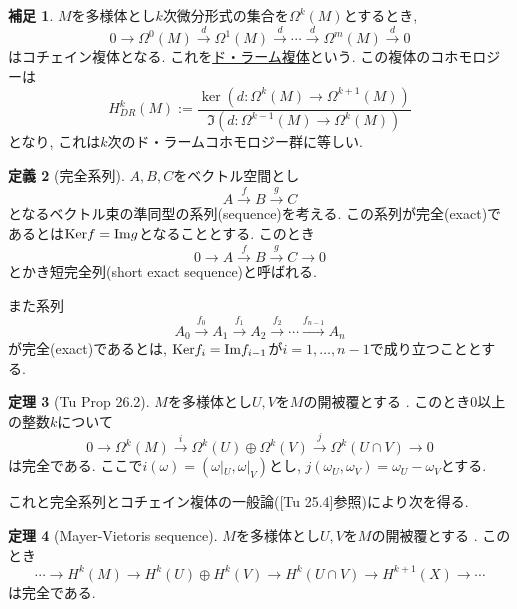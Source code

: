 \documentclass[dvipdfmx,a4paper,11pt]{article}
\newcommand{\Ker}{{\rm Ker}}
\newcommand{\ima}{{\rm Im}}
\theoremstyle{definition}
\newtheorem{thm}{定理}
\newtheorem{dfn}[thm]{定義}
\newtheorem{rem}[thm]{補足}
\begin{document}
   \begin{rem}
$M$を多様体とし$k$次微分形式の集合を$\Omega^{k}(M)$とするとき, 
$$
0 \rightarrow \Omega^{0}(M) \overset{d}{\rightarrow}\Omega^{1}(M) \overset{d}{\rightarrow} \cdots 
\overset{d}{\rightarrow} \Omega^{m}(M) \overset{d}{\rightarrow} 0
$$
はコチェイン複体となる. これを\underline{ド・ラーム複体}という. 
この複体のコホモロジーは
$$
H_{DR}^{k}(M):= \frac{\ker (d : \Omega^{k}(M) \rightarrow  \Omega^{k+1}(M))}{\Im(d : \Omega^{k-1}(M) \rightarrow  \Omega^{k}(M)) }
$$
となり, これは$k$次のド・ラームコホモロジー群に等しい.
\end{rem}


\begin{tcolorbox}[
    colback = white,
    colframe = green!35!black,
    fonttitle = \bfseries,
    breakable = true]
\begin{dfn}[完全系列]
$A,B,C$をベクトル空間とし
$$
A \stackrel{f}{\to} B \stackrel{g}{\to} C
$$
となるベクトル束の準同型の系列(sequence)を考える. 
この系列が完全(exact)であるとは$\Ker f = \ima g$となることとする. 
このとき
$$
0 \to A \stackrel{f}{\to} B \stackrel{g}{\to} C \to 0
$$
とかき短完全列(short exact sequence)と呼ばれる. 

また系列
$$
A_0 \stackrel{f_0}{\to} A_1 \stackrel{f_1}{\to} A_2 \stackrel{f_2}{\to}  \cdots \stackrel{f_{n-1}}{\to} A_{n}
$$
が完全(exact)であるとは, $\Ker f_{i} = \ima f_{i-1}$が$i=1, \ldots, n-1$で成り立つこととする. 
\end{dfn}
\end{tcolorbox}  


\begin{tcolorbox}[
    colback = white,
    colframe = green!35!black,
    fonttitle = \bfseries,
    breakable = true]
\begin{thm}[Tu Prop 26.2]
$M$を多様体とし$U, V$を$M$の開被覆とする . 
このとき0以上の整数$k$について
$$
0 \to \Omega^{k}(M)  \stackrel{i}{\to}  \Omega^{k}(U)\oplus \Omega^{k}(V) \stackrel{j}{\to} \Omega^{k}(U \cap V) \to 0
$$
は完全である. ここで$i (\omega) = (\omega|_{U}, \omega|_{V})$とし, 
$j(\omega_{U}, \omega_{V}) = \omega_U - \omega_{V}$とする. 
\end{thm}
\end{tcolorbox}  

これと完全系列とコチェイン複体の一般論([Tu 25.4]参照)により次を得る. 


\begin{tcolorbox}[
    colback = white,
    colframe = green!35!black,
    fonttitle = \bfseries,
    breakable = true]
\begin{thm}[Mayer-Vietoris sequence]
$M$を多様体とし$U, V$を$M$の開被覆とする . 
このとき
\[
\cdots \longrightarrow H^k(M) \longrightarrow H^k(U) \oplus H^k(V) \longrightarrow H^k(U \cap V) \longrightarrow H^{k+1}(X) \longrightarrow \cdots
\]
は完全である. 
\end{thm}
\end{tcolorbox} 
\end{document}
